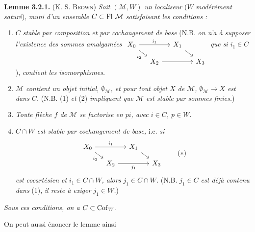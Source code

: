 \textbf{Lemme 3.2.1.} (K. S. \textsc{Brown}) \textit{Soit $(\mathcal{M}, W)$ un localiseur} ($W$ \textit{modérément saturé}), \textit{muni d'un ensemble $C \subset \operatorname{Fl}\,\mathcal{M}$ satisfaisant les conditions :}
\begin{enumerate}
\item[1)] \textit{$C$ stable par composition et par cochangement de base} (N.B. \textit{on n'a à supposer l'existence des sommes amalgamées}
$\begin{tikzcd}[ampersand replacement=\&, baseline=(\tikzcdmatrixname-1-1.base), row sep=small, column sep=small]
X_0 \arrow[rr, "i_1"] \arrow[dr, "i_2"'] \& \& X_1 \arrow[dr] \& \\
\& X_2 \arrow[rr] \& \& X_3
\end{tikzcd}$
\textit{que si $i_1 \in C$}), \textit{contient les isomorphismes.}
\item[2)] \textit{$\mathcal{M}$ contient un objet initial, $\emptyset_{\mathcal{M}}$, et pour tout objet $X$ de $\mathcal{M}$, $\emptyset_{\mathcal{M}} \longrightarrow X$ est dans $C$.} (N.B. (1) \textit{et} (2) \textit{impliquent que $\mathcal{M}$ est stable par sommes finies.})
\item[3)] \textit{Toute flèche $f$ de $\mathcal{M}$ se factorise en $pi$, avec $i \in C$, $p \in W$.}
\item[4)] \textit{$C \cap W$ est stable par cochangement de base,} i.e. \textit{si}
\[
\begin{tikzcd}[ampersand replacement=\&, row sep=small, column sep=small]
X_0 \arrow[rr, "i_1"] \arrow[dr, "i_2"'] \& \& X_1 \arrow[dr] \& \\
\& X_2 \arrow[rr, "j_1"'] \& \& X_3
\end{tikzcd}
\tag*{$(*)$}
\]
\textit{est cocartésien et $i_1 \in C \cap W$, alors $j_1 \in C \cap W$.} (N.B. \textit{$j_1 \in C$ est déjà contenu dans} (1), \textit{il reste à exiger $j_1 \in W$.})
\end{enumerate}
\textit{Sous ces conditions, on a $C \subset \mathrm{Cof}_W$.}

On peut aussi énoncer le lemme ainsi

